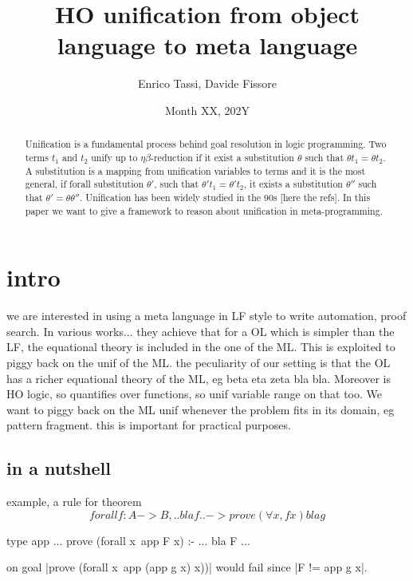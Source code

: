 \documentclass{rapport}
\author{Enrico Tassi, Davide Fissore}
\title{HO unification from object language to meta language}
\date{Month XX, 202Y}
\begin{document}
\maketitle

\def\elpi{\proglang{elpi}}
\def\coqelpi{\proglang{coq-elpi}}
\def\lambdaprolog{\proglang{$\lambda$-prolog}}
\def\coq{\proglang{coq}}

\newcommand*{\acronym}[1]{\texttt{#1}\xspace}

\def\ol{\acronym{ol}}
\def\ml{\acronym{ml}}

\newcommand*{\eqtau}{\ensuremath{\mathrel{\overset{\mathrm{\tau}}{=}}}}
\begin{abstract}


  Unification is a fundamental process behind goal resolution in logic
  programming. Two terms $t_1$ and $t_2$ unify up to $\eta\beta$-reduction if it
  exist a substitution $\theta$ such that $\theta t_1 = \theta t_2$. A
  substitution is a mapping from unification variables to terms and it is the most
  general, if forall substitution $\theta'$, such that $\theta' t_1 = \theta'
  t_2$, it exists a substitution $\theta''$ such that $\theta' = \theta \theta''$.
  Unification has been widely studied in the 90s [here the refs]. In this paper we
  want to give a framework to reason about unification in meta-programming.
  
  \end{abstract}
  
  
\section{intro}

we are interested in using a meta language in LF style to write
automation, proof search. In various works... they achieve that
for a OL which is simpler than the LF, the equational theory is included
in the one of the ML. This is exploited to piggy back on the unif
of the ML.
the peculiarity of our setting is that the OL has a richer equational
theory of the ML, eg beta eta zeta bla bla. Moreover is HO logic, so
quantifies over functions, so unif variable range on that too.
We want to piggy back on the ML unif whenever the problem fits
in its domain, eg pattern fragment.
this is important for practical purposes.

\subsection{in a nutshell}
example, a rule for theorem
$$
forall f : A -> B, .. bla f .. -> prove (\forall x, f x)
bla g
$$
\begin{elpicode}
type app ...
prove (forall x\ app F x) :- ... bla F ...
\end{elpicode}
on goal |prove (forall x\ app (app g x) x))|
would fail since |F != app g x|.
\end{document}
